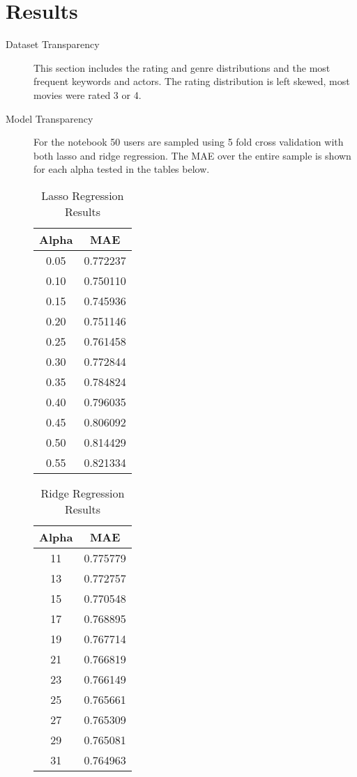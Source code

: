 \documentclass[letterpaper, 10 pt, conference]{ieeeconf}  %
\begin{document}
\section{Results}
\begin{description}
\item[Dataset Transparency] This section includes the rating and genre distributions and the most frequent keywords and actors. The rating distribution is left skewed, most movies were rated 3 or 4. 
\item[Model Transparency]
For the notebook 50 users are sampled using 5 fold cross validation with both lasso and ridge regression. The MAE over the entire sample is shown for each alpha tested in the tables below.

\begin{table}[h]
\caption{Lasso Regression Results}
\centering
\label{table_example}
\begin{center}
\begin{tabular}{c c}
\hline
Alpha & MAE\\
\hline
0.05 & 0.772237\\
0.10 & 0.750110\\
0.15 & 0.745936\\
0.20 & 0.751146\\
0.25 & 0.761458\\
0.30 & 0.772844\\
0.35 & 0.784824\\
0.40 & 0.796035\\
0.45 & 0.806092\\
0.50 & 0.814429\\
0.55 & 0.821334\\
\hline
\end{tabular}
\end{center}
\end{table}

\begin{table}[h]
\caption{Ridge Regression Results}
\centering
\label{table_example}
\begin{center}
\begin{tabular}{c c}
\hline
Alpha & MAE\\
\hline
11 & 0.775779\\
13 & 0.772757\\
15 & 0.770548\\
17 & 0.768895\\
19 & 0.767714\\
21 & 0.766819\\
23 & 0.766149\\
25 & 0.765661\\
27 & 0.765309\\
29 & 0.765081\\
31 & 0.764963\\
\hline
\end{tabular}
\end{center}
\end{table}


\end{description}
\end{document}
